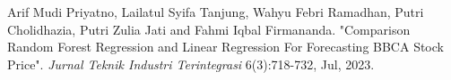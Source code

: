 \begin{thebibliography}{00}
 Arif Mudi Priyatno, Lailatul Syifa Tanjung, Wahyu Febri Ramadhan, Putri Cholidhazia, Putri Zulia Jati and Fahmi Iqbal Firmananda. "Comparison Random Forest Regression and Linear Regression For Forecasting BBCA Stock Price". \textit{Jurnal Teknik Industri Terintegrasi} 6(3):718-732, Jul, 2023.

\end{thebibliography}
